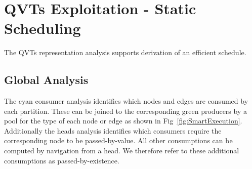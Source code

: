 \documentclass{llncs}
\begin{document}


\section{QVTs Exploitation - Static Scheduling}\label{QVTs Exploitation}

The QVTs representation analysis supports derivation of an efficient schedule.

\subsection{Global Analysis}

The cyan consumer analysis identifies which nodes and edges are consumed by each partition. These can be joined to the corresponding green producers by a pool for the type of each node or edge as shown in Fig~\ref{fig:SmartExecution}. Additionally the heads analysis identifies which consumers require the corresponding node to be passed-by-value. All other consumptions can be computed by navigation from a head. We therefore refer to these additional consumptions as passed-by-existence.

\end{document}
